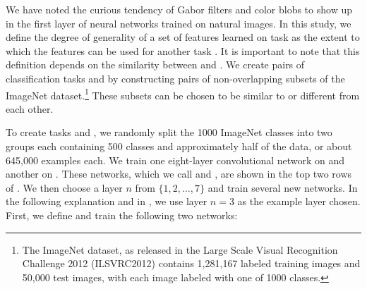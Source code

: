 We have noted the curious tendency of Gabor filters and color blobs to show up in the first layer of neural networks trained on natural images.
In this study, we define the degree of generality of a set of features learned on task \dA as the extent to which the features can 
be used for another task \dB.
It is important to note that this definition depends on the similarity between \dA and \dB. We create pairs of classification tasks \dA and \dB by constructing pairs of non-overlapping subsets of the ImageNet dataset.\footnote{The ImageNet dataset, as released in the Large Scale Visual Recognition Challenge 2012 (ILSVRC2012) \citep{imagenet_cvpr09} contains 1,281,167 labeled training images and 50,000 test images, with each image labeled with one of 1000 classes.}
These subsets can be chosen to be similar to or different from each other.

To create tasks \dA and \dB, we randomly split the 1000 ImageNet classes into two groups each containing 500 classes and approximately half of the data, or about 645,000 examples each.
We train one eight-layer convolutional network on \dA and another on \dB. These networks, which we call  and , are shown in the top two rows of .
We then choose a layer $n$ from $\{1, 2, \ldots, 7\}$ and train several new networks. In the following explanation and in , we use layer $n=3$ as the example layer chosen.
First, we define and train the following two networks:

